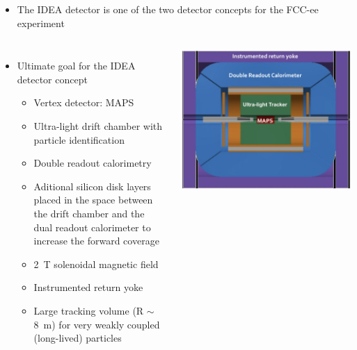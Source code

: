 \documentclass[final,xcolor={dvipsnames,svgnames,x11names,table}]{beamer}
\begin{document}
\begin{frame}
\begin{textblock}{43}
\begin{tcolorbox}[title=The IDEA detector concept for FCC-ee]
  \begin{itemize}
    \item The IDEA detector is one of the two detector concepts for the FCC-ee experiment
  \end{itemize}

  \begin{columns}
      \begin{itemize}
        \item Ultimate goal for the IDEA detector concept
          \begin{itemize}
            \item Vertex detector: MAPS
            \item Ultra-light drift chamber with particle identification
            \item Double readout calorimetry
            \item Aditional silicon disk layers placed in the space between the drift chamber and the dual readout calorimeter to increase the forward coverage
            \item 2~T solenoidal magnetic field
            \item Instrumented return yoke
            \item Large tracking volume (R $\sim$ 8~m) for very weakly coupled (long-lived) particles
          \end{itemize}
      \end{itemize}


      \centering
      \includegraphics[width=\textwidth]{../figures/FCCeeIDEAConcept}
  \end{columns}



\end{tcolorbox}
\end{textblock}
\end{frame}
\end{document}
